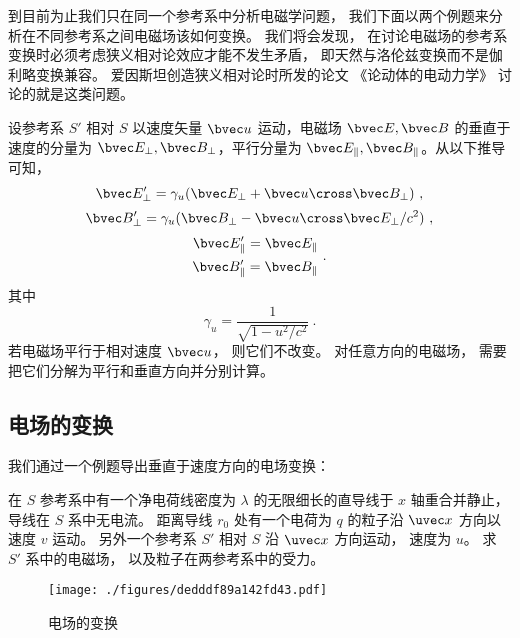 
\begin{issues}
\issueTODO
{}
\end{issues}


到目前为止我们只在同一个参考系中分析电磁学问题， 我们下面以两个例题来分析在不同参考系之间电磁场该如何变换。 我们将会发现， 在讨论电磁场的参考系变换时必须考虑狭义相对论效应才能不发生矛盾， 即天然与洛伦兹变换而不是伽利略变换兼容。 爱因斯坦创造狭义相对论时所发的论文 《论动体的电动力学》 讨论的就是这类问题。

设参考系 $S'$ 相对 $S$ 以速度矢量 $\bvec u$ 运动，电磁场 $\bvec E, \bvec B$ 的垂直于速度的分量为 $\bvec E_\perp, \bvec B_\perp$，平行分量为 $\bvec E_\parallel, \bvec B_\parallel$。从以下推导可知，
\begin{equation}\label{eq_EMRef_1}
\bvec E_\perp' = \gamma_u (\bvec E_\perp + \bvec u \cross \bvec B_\perp)~,
\end{equation}
\begin{equation}\label{eq_EMRef_2}
\bvec B_\perp' = \gamma_u (\bvec B_\perp - \bvec u \cross \bvec E_\perp/c^2)~,
\end{equation}
\begin{equation}
\begin{aligned}
\bvec E_\parallel' =\bvec E_\parallel\\ 
\bvec B_\parallel' =\bvec B_\parallel
\end{aligned}~.
\end{equation}
其中
\begin{equation}
\gamma_u = \frac{1}{\sqrt{1 - u^2/c^2}}~.
\end{equation}
若电磁场平行于相对速度 $\bvec u$， 则它们不改变。 对任意方向的电磁场， 需要把它们分解为平行和垂直方向并分别计算。

\subsection{电场的变换}
我们通过一个例题导出垂直于速度方向的电场变换：

\begin{example}{}
在 $S$ 参考系中有一个净电荷线密度为 $\lambda$ 的无限细长的直导线于 $x$ 轴重合并静止，导线在 $S$ 系中无电流。 距离导线 $r_0$ 处有一个电荷为 $q$ 的粒子沿 $\uvec x$ 方向以速度 $v$ 运动。 另外一个参考系 $S'$ 相对 $S$ 沿 $\uvec x$ 方向运动， 速度为 $u$。 求 $S'$ 系中的电磁场， 以及粒子在两参考系中的受力。
\begin{figure}[ht]
\centering
\texttt{[image: ./figures/dedddf89a142fd43.pdf]}
\caption{电场的变换} \label{fig_EMRef_1}
\end{figure}
\end{example}

